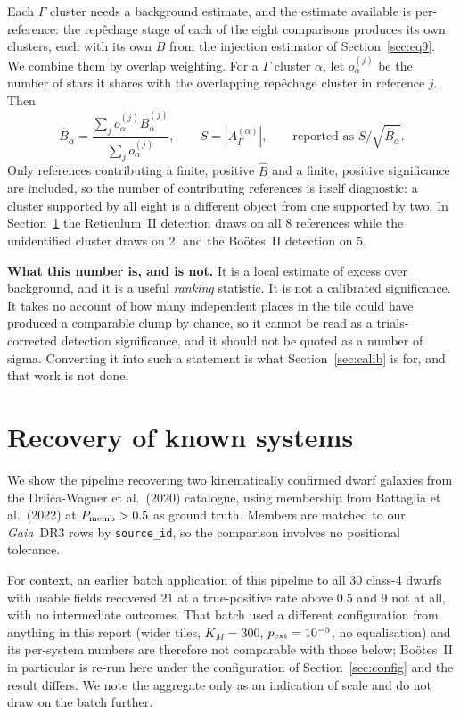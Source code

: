 \documentclass[11pt,a4paper]{article}
\newcommand{\Ups}{\Upsilon}                  %
\newcommand{\Gam}{\Gamma}                    %
\newcommand{\Ups}{\Upsilon}
\newcommand{\Gam}{\Gamma}
\newcommand{\Bhat}{\hat{B}}
\newcommand{\Gaia}{\textit{Gaia}}
\begin{document}
Each $\Gam$ cluster needs a background estimate, and the estimate available is per-reference: the
rep\^echage stage of each of the eight comparisons produces its own clusters, each with its own
$\Bhat$ from the injection estimator of Section~\ref{sec:eq9}. We combine them by overlap
weighting. For a $\Gam$ cluster $\alpha$, let $o^{(j)}_\alpha$ be the number of stars it shares with
the overlapping rep\^echage cluster in reference $j$. Then
%
\begin{equation}
\Bhat_\alpha = \frac{\sum_j o^{(j)}_\alpha \Bhat^{(j)}_\alpha}{\sum_j o^{(j)}_\alpha},
\qquad S = |A_\Gam^{(\alpha)}|,
\qquad \text{reported as } S/\sqrt{\Bhat_\alpha}.
\end{equation}
%
Only references contributing a finite, positive $\Bhat$ and a finite, positive significance are
included, so the number of contributing references is itself diagnostic: a cluster supported by all
eight is a different object from one supported by two. In Section~\ref{sec:recovery} the
Reticulum~II detection draws on all 8 references while the unidentified cluster draws on 2, and the
Bo\"otes~II detection on 5.

\textbf{What this number is, and is not.} It is a local estimate of excess over background, and it
is a useful \emph{ranking} statistic. It is not a calibrated significance. It takes no account of
how many independent places in the tile could have produced a comparable clump by chance, so it
cannot be read as a trials-corrected detection significance, and it should not be quoted as a
number of sigma. Converting it into such a statement is what Section~\ref{sec:calib} is for, and
that work is not done.

\section{Recovery of known systems}
\label{sec:recovery}

We show the pipeline recovering two kinematically confirmed dwarf galaxies from the
Drlica-Wagner et al.\ (2020) catalogue, using membership from Battaglia et al.\ (2022) at
$P_{\rm memb} > 0.5$ as ground truth. Members are matched to our \Gaia\ DR3 rows by
\texttt{source\_id}, so the comparison involves no positional tolerance.

For context, an earlier batch application of this pipeline to all 30 class-4 dwarfs with usable
fields recovered 21 at a true-positive rate above 0.5 and 9 not at all, with no intermediate
outcomes. That batch used a different configuration from anything in this report (wider tiles,
$K_M = 300$, $p_{\rm ext} = 10^{-5}$, no equalisation) and its per-system numbers are therefore not
comparable with those below; Bo\"otes~II in particular is re-run here under the configuration of
Section~\ref{sec:config} and the result differs. We note the aggregate only as an indication of
scale and do not draw on the batch further.
\end{document}

